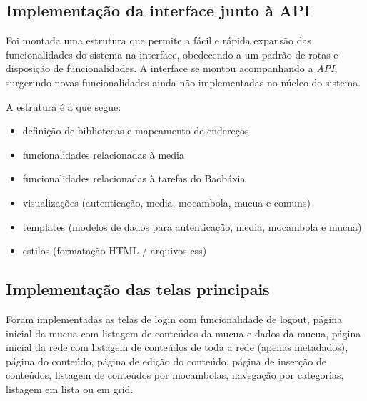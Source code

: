 \subsection{Implementação da interface junto à API}
Foi montada uma estrutura que permite a fácil e rápida expansão das
funcionalidades do sistema na interface, obedecendo a um padrão de rotas e
disposição de funcionalidades. A interface se montou acompanhando a \emph{API},
surgerindo novas funcionalidades ainda não implementadas no núcleo do sistema.

A estrutura é a que segue:
\begin{itemize}
  \item definição de bibliotecas e mapeamento de endereços
  \item funcionalidades relacionadas à media
  \item funcionalidades relacionadas à tarefas do Baobáxia
  \item visualizações (autenticação, media, mocambola, mucua e comuns)
  \item templates (modelos de dados para autenticação, media, mocambola e mucua)
  \item estilos (formatação HTML / arquivos css)
\end{itemize}

\subsection{Implementação das telas principais}
Foram implementadas as telas de login com funcionalidade de logout,
página inicial da mucua com listagem de conteúdos da mucua e dados da mucua,
página inicial da rede com listagem de conteúdos de toda a rede (apenas
metadados), página do conteúdo, página de edição do conteúdo, página de
inserção de conteúdos, listagem de conteúdos por mocambolas, navegação
por categorias, listagem em lista ou em grid.
